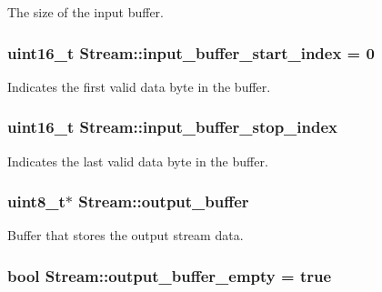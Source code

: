 The size of the input buffer. \hypertarget{class_stream_a6fc009e9e71fa92cbbf9b407ede82a73}{
\subsubsection[{input\-\_\-buffer\-\_\-start\-\_\-index}]{\setlength{\rightskip}{0pt plus 5cm}uint16\-\_\-t Stream\-::input\-\_\-buffer\-\_\-start\-\_\-index = 0\hspace{0.3cm}{\ttfamily [protected]}}}\label{class_stream_a6fc009e9e71fa92cbbf9b407ede82a73}
Indicates the first valid data byte in the buffer. \hypertarget{class_stream_aaceece6a2defd1f7d9667fcc0be03a7a}{
\subsubsection[{input\-\_\-buffer\-\_\-stop\-\_\-index}]{\setlength{\rightskip}{0pt plus 5cm}uint16\-\_\-t Stream\-::input\-\_\-buffer\-\_\-stop\-\_\-index\hspace{0.3cm}{\ttfamily [protected]}}}\label{class_stream_aaceece6a2defd1f7d9667fcc0be03a7a}
Indicates the last valid data byte in the buffer. \hypertarget{class_stream_a3cd072a10ad5c1b6308dd2da2cdbec71}{
\subsubsection[{output\-\_\-buffer}]{\setlength{\rightskip}{0pt plus 5cm}uint8\-\_\-t$\ast$ Stream\-::output\-\_\-buffer\hspace{0.3cm}{\ttfamily [protected]}}}\label{class_stream_a3cd072a10ad5c1b6308dd2da2cdbec71}
Buffer that stores the output stream data. \hypertarget{class_stream_a54b21caaee0001e44968fb70d0a591f5}{
\subsubsection[{output\-\_\-buffer\-\_\-empty}]{\setlength{\rightskip}{0pt plus 5cm}bool Stream\-::output\-\_\-buffer\-\_\-empty = true\hspace{0.3cm}{\ttfamily [protected]}}}\label{class_stream_a54b21caaee0001e44968fb70d0a591f5}
